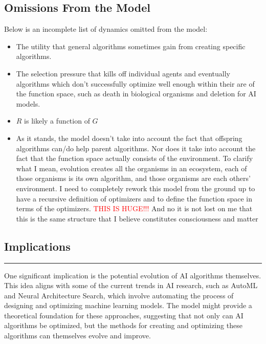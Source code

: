 \documentclass{article}[10pt]
\begin{document}
\subsection{Omissions From the Model}

Below is an incomplete list of dynamics omitted from the model:

\begin{itemize}
    \item The utility that general algorithms sometimes gain from creating specific algorithms.
    \item The selection pressure that kills off individual agents and eventually algorithms which don't successfully optimize well enough within their are of the function space, such as death in biological organisms and deletion for AI models.
    \item $R$ is likely a function of $G$
    \item As it stands, the model doesn't take into account the fact that offspring algorithms can/do help parent algorithms.
    Nor does it take into account the fact that the function space actually consists of the environment.
    To clarify what I mean, evolution creates all the organisms in an ecosystem, each of those organisms is its own algorithm, and those organisms are each others' environment. 
    I need to completely rework this model from the ground up to have a recursive definition of optimizers and to define the function space in terms of the optimizers. 
    \textcolor{red}{THIS IS HUGE!!!}
    And no it is not lost on me that this is the same structure that I believe constitutes consciousness and matter
\end{itemize}



\subsection{Implications}

\rule{\textwidth}{0.5pt}

One significant implication is the potential evolution of AI algorithms themselves. This idea aligns with some of the current trends in AI research, such as AutoML and Neural Architecture Search, which involve automating the process of designing and optimizing machine learning models. 
The model might provide a theoretical foundation for these approaches, suggesting that not only can AI algorithms be optimized, but the methods for creating and optimizing these algorithms can themselves evolve and improve.\par
\end{document}
